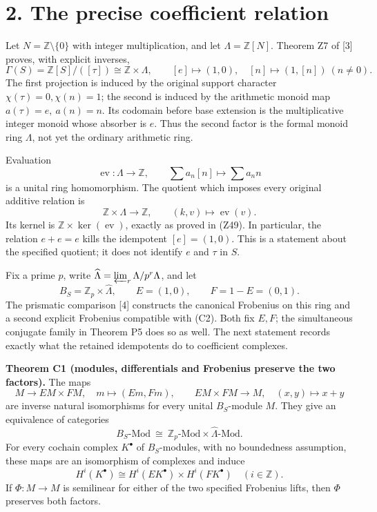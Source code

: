 \documentclass[
]{article}
\begin{document}
\section{2. The precise coefficient
relation}\label{the-precise-coefficient-relation}

Let \(N=\mathbb Z\setminus\{0\}\) with integer multiplication, and let
\(\Lambda=\mathbb Z[N]\). Theorem Z7 of {[}3{]} proves, with explicit
inverses, \[
\Gamma(S)=\mathbb Z[S]/([\tau])
\cong\mathbb Z\times\Lambda,\qquad
[e]\longmapsto(1,0),\quad
[n]\longmapsto(1,[n])\ (n\ne0).
\tag{C1}
\] The first projection is induced by the original support character
\(\chi(\tau)=0,\chi(n)=1\); the second is induced by the arithmetic
monoid map \(a(\tau)=e,\ a(n)=n\). Its codomain before base extension is
the multiplicative integer monoid whose absorber is \(e\). Thus the
second factor is the formal monoid ring \(\Lambda\), not yet the
ordinary arithmetic ring.

Evaluation \[
\operatorname{ev}:\Lambda\longrightarrow\mathbb Z,\qquad
\sum a_n[n]\longmapsto\sum a_nn
\] is a unital ring homomorphism. The quotient which imposes every
original additive relation is \[
\mathbb Z\times\Lambda\longrightarrow\mathbb Z,\qquad
(k,v)\longmapsto\operatorname{ev}(v).
\tag{C2}
\] Its kernel is \(\mathbb Z\times\ker(\operatorname{ev})\), exactly as
proved in (Z49). In particular, the relation \(e+e=e\) kills the
idempotent \([e]=(1,0)\). This is a statement about the specified
quotient; it does not identify \(e\) and \(\tau\) in \(S\).

Fix a prime \(p\), write
\(\widehat\Lambda=\varprojlim_r\Lambda/p^r\Lambda\), and let \[
B_S=\mathbb Z_p\times\widehat\Lambda,\qquad
E=(1,0),\qquad F=1-E=(0,1).
\tag{C3}
\] The prismatic comparison {[}4{]} constructs the canonical Frobenius
on this ring and a second explicit Frobenius compatible with (C2). Both
fix \(E,F\); the simultaneous conjugate family in Theorem P5 does so as
well. The next statement records exactly what the retained idempotents
do to coefficient complexes.

\textbf{Theorem C1 (modules, differentials and Frobenius preserve the
two factors).} The maps \[
M\longrightarrow EM\times FM,\quad m\longmapsto(Em,Fm),
\qquad
EM\times FM\longrightarrow M,\quad(x,y)\longmapsto x+y
\tag{C4}
\] are inverse natural isomorphisms for every unital \(B_S\)-module
\(M\). They give an equivalence of categories \[
B_S\text{-}\mathrm{Mod}\ \cong\
\mathbb Z_p\text{-}\mathrm{Mod}\times
\widehat\Lambda\text{-}\mathrm{Mod}.
\tag{C5}
\] For every cochain complex \(K^\bullet\) of \(B_S\)-modules, with no
boundedness assumption, these maps are an isomorphism of complexes and
induce \[
H^i(K^\bullet)\cong
H^i(EK^\bullet)\times H^i(FK^\bullet)
\quad(i\in\mathbb Z).
\tag{C6}
\] If \(\Phi:M\to M\) is semilinear for either of the two specified
Frobenius lifts, then \(\Phi\) preserves both factors.
\end{document}
